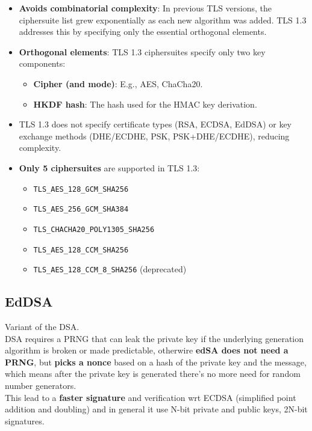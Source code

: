 \begin{itemize}
    \item \textbf{Avoids combinatorial complexity}: In previous TLS versions, the ciphersuite list grew exponentially as each new algorithm was added. TLS 1.3 addresses this by specifying only the essential orthogonal elements.
    
    \item \textbf{Orthogonal elements}: TLS 1.3 ciphersuites specify only two key components:
    \begin{itemize}
        \item \textbf{Cipher (and mode)}: E.g., AES, ChaCha20.
        \item \textbf{HKDF hash}: The hash used for the HMAC key derivation.
    \end{itemize}
    
    \item TLS 1.3 does not specify certificate types (RSA, ECDSA, EdDSA) or key exchange methods (DHE/ECDHE, PSK, PSK+DHE/ECDHE), reducing complexity.

    \item \textbf{Only 5 ciphersuites} are supported in TLS 1.3:
    \begin{itemize}[itemsep=0pt]
        \item \texttt{TLS\_AES\_128\_GCM\_SHA256}
        \item \texttt{TLS\_AES\_256\_GCM\_SHA384}
        \item \texttt{TLS\_CHACHA20\_POLY1305\_SHA256}
        \item \texttt{TLS\_AES\_128\_CCM\_SHA256}
        \item \texttt{TLS\_AES\_128\_CCM\_8\_SHA256} (deprecated)
    \end{itemize}
\end{itemize}

\subsection{EdDSA}
Variant of the DSA. \\
DSA requires a PRNG that can leak the private key if the underlying generation algorithm is broken or made predictable, otherwire \textbf{edSA does not need a PRNG}, but \textbf{picks a nonce} based on a hash of the private key and the message, which means after the private key is generated there's no more need for random number generators. \\
This lead to a \textbf{faster signature} and verification wrt ECDSA (simplified point addition and doubling) and in general it use N-bit private and public keys, 2N-bit signatures. \\

